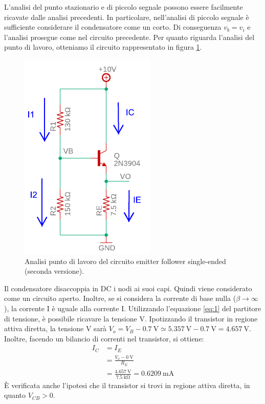\noindent
L'analisi del punto stazionario e di piccolo segnale possono essere facilmente ricavate dalle analisi precedenti. In particolare, nell'analisi di piccolo segnale è sufficiente considerare il condensatore come un corto. Di conseguenza $v_b=v_i$ e l'analisi prosegue come nel circuito precedente. Per quanto riguarda l'analisi del punto di lavoro, otteniamo il circuito rappresentato in figura \ref{fig:emitterfollwer_v2_DC}. 
\begin{figure}[h!]
	\centering
	\includegraphics[width=0.4\linewidth]{./OtherFiles/Laboratorio 2/emitter follower_v2_punto di lavoro-printout}
	\caption{Analisi punto di lavoro del circuito emitter follower single-ended (seconda versione).}
	\label{fig:emitterfollwer_v2_DC}
\end{figure}
Il condensatore disaccoppia in DC i nodi ai suoi capi. Quindi viene considerato come un circuito aperto. Inoltre, se si considera la corrente di base nulla ($\beta\to\infty$), la corrente I è uguale alla corrente I. Utilizzando l'equazione \ref{eq:1} del partitore di tensione, è possibile ricavare la tensione V. Ipotizzando il transistor in regione attiva diretta, la tensione V sarà $V_o=V_B-\SI{0.7}{\volt}\simeq\SI{5.357}{\volt}-\SI{0.7}{\volt}=\SI{4.657}{\volt}$. Inoltre, facendo un bilancio di correnti nel transistor, si ottiene:
\begin{equation}
	\begin{split}
		I_C&=I_E \\
		&=\frac{V_o-\SI{0}{\volt}}{R_E} \\
		&=\frac{\SI{4.657}{\volt}}{\SI{7.5}{\kilo\ohm}}=\SI{0.6209}{\milli\ampere}
	\end{split}
\end{equation}
\`E verificata anche l'ipotesi che il transistor si trovi in regione attiva diretta, in quanto $V_{CB}>0$.

